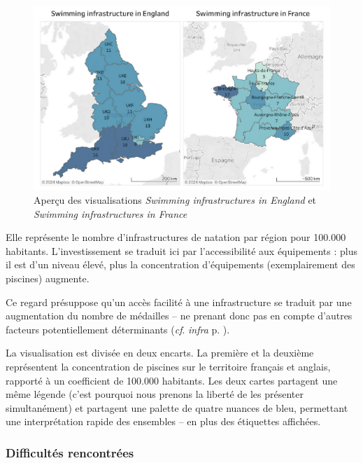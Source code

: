 \documentclass[hidelinks, 12pt]{report}
\begin{document}
\begin{center}
	\begin{figure}[H]
		\centering
		\setlength{\belowcaptionskip}{-35pt}
		\includegraphics[scale=0.6]{images/datavis-swim-fr-eng.png}
		\captionsetup{justification=centering}
		\caption{Aperçu des visualisations \textit{Swimming infrastructures in England} et \textit{Swimming infrastructures in France}}
	\end{figure}
\end{center}

Elle représente le nombre d'infrastructures de natation par région pour 100.000 habitants. L'investissement se traduit ici par l'accessibilité aux équipements : plus il est d'un niveau élevé, plus la concentration d'équipements (exemplairement des piscines) augmente.

Ce regard présuppose qu'un accès facilité à une infrastructure se traduit par une augmentation du nombre de médailles -- ne prenant donc pas en compte d'autres facteurs potentiellement déterminants (\textit{cf}. \textit{infra} p. \pageref{biais}).

La visualisation est divisée en deux encarts. La première et la deuxième représentent la concentration de piscines sur le territoire français et anglais, rapporté à un coefficient de 100.000 habitants. Les deux cartes partagent une même légende (c'est pourquoi nous prenons la liberté de les présenter simultanément) et partagent une palette de quatre nuances de bleu, permettant une interprétation rapide des ensembles -- en plus des étiquettes affichées.

\subsubsection{Difficultés rencontrées}
\end{document}
